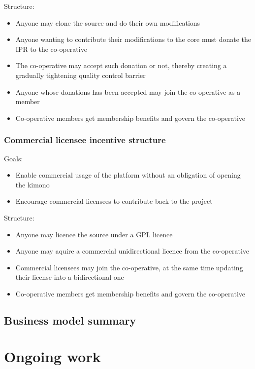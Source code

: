 \documentclass[draft,a4paper]{siamltex}
\begin{document}
Structure:
\begin{itemize}
  \item Anyone may clone the source and do their own modifications
  \item Anyone wanting to contribute their modifications to the core
    must donate the IPR to the co-operative
  \item The co-operative may accept such donation or not, thereby
    creating a gradually tightening quality control barrier
  \item Anyone whose donations has been accepted may join the
    co-operative as a member
  \item Co-operative members get membership benefits and govern the
    co-operative
\end{itemize}

\subsubsection{Commercial licensee incentive structure}

Goals:
\begin{itemize}
  \item Enable commercial usage of the platform without an obligation
    of opening the kimono
  \item Encourage commercial licensees to contribute back to the
    project
\end{itemize}

Structure:
\begin{itemize}
  \item Anyone may licence the source under a GPL licence
  \item Anyone may aquire a commercial unidirectional licence from
    the co-operative
  \item Commercial licensees may join the co-operative, at the same
    time updating their license into a bidirectional one
  \item Co-operative members get membership benefits and govern the
    co-operative
\end{itemize}

\subsection{Business model summary}


\section{Ongoing work}
\label{sec:ongoing}
\end{document}
